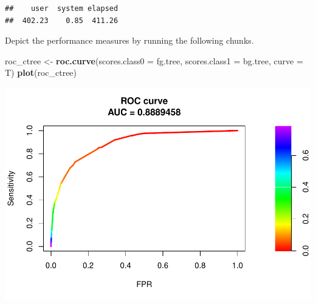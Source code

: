 \documentclass[]{article}
\newenvironment{Shaded}{\begin{snugshade}}{\end{snugshade}}
\newcommand{\CommentTok}[1]{\textcolor[rgb]{0.56,0.35,0.01}{\textit{#1}}}
\newcommand{\DataTypeTok}[1]{\textcolor[rgb]{0.13,0.29,0.53}{#1}}
\newcommand{\DecValTok}[1]{\textcolor[rgb]{0.00,0.00,0.81}{#1}}
\newcommand{\KeywordTok}[1]{\textcolor[rgb]{0.13,0.29,0.53}{\textbf{#1}}}
\newcommand{\NormalTok}[1]{#1}
\newcommand{\OperatorTok}[1]{\textcolor[rgb]{0.81,0.36,0.00}{\textbf{#1}}}
\newcommand{\StringTok}[1]{\textcolor[rgb]{0.31,0.60,0.02}{#1}}
\begin{document}
\begin{verbatim}
##    user  system elapsed 
##  402.23    0.85  411.26
\end{verbatim}

Depict the performance measures by running the following chunks.

\begin{Shaded}
\end{Shaded}

\begin{Shaded}
\end{Shaded}

\begin{Shaded}
\begin{Highlighting}[]
\NormalTok{roc_ctree <-}\StringTok{ }\KeywordTok{roc.curve}\NormalTok{(}\DataTypeTok{scores.class0 =}\NormalTok{ fg.tree,}
                       \DataTypeTok{scores.class1 =}\NormalTok{ bg.tree,}
                       \DataTypeTok{curve =}\NormalTok{ T)}
\KeywordTok{plot}\NormalTok{(roc_ctree) }
\end{Highlighting}
\end{Shaded}

\includegraphics{lagged_analyses_files/figure-latex/unnamed-chunk-30-1.pdf}
\end{document}
